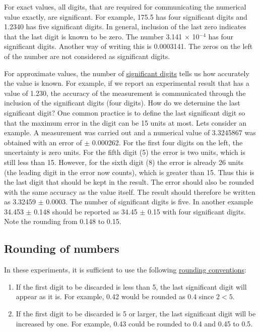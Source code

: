 \documentclass[byrevtex,amssymb,aps,pra,floatfix,letterpaper]{revtex4}
\begin{document}
For exact values, all digits, that are required for communicating the numerical value exactly, are significant. For example, 175.5 has four significant digits and 1.2340 has five significant digits. In general, inclusion of the last zero indicates that the last digit is known to be zero. The number 3.141 $\times$ 10$^{-4}$ has four significant digits. Another way of writing this is 0.0003141. The zeros on the left of the number are not considered as significant digits.

For approximate values, the number of \href{http://en.wikipedia.org/wiki/Significant_figures}{\underline{significant digits}} tells us how accurately the value is known. For example, if we report an experimental result that has a value of 1.230, the accuracy of the measurement is communicated through the inclusion of the significant digits (four digits). How do we determine the last significant digit? One common practice is to define the last significant digit so that the maximum error in the digit can be 15 units at most. Lets consider an example. A measurement was carried out and a numerical value of 3.3245867 was obtained with an error of $\pm$ 0.000262. For the first four digits on the left, the uncertainty is zero units. For the fifth digit (5) the error is two units, which is still less than 15. However, for the sixth digit (8) the error is already 26 units (the leading digit in the error now counts), which is greater than 15. Thus this is the last digit that should be kept in the result. The error should also be rounded with the same accuracy as the value itself. The result should therefore be written as 3.32459 $\pm$ 0.0003. The number of significant digits is five. In another example 34.453 $\pm$ 0.148 should be reported as 34.45 $\pm$ 0.15 with four significant digits. Note the rounding from 0.148 to 0.15.

\subsection{Rounding of numbers}

In these experiments, it is sufficient to use the following \href{http://en.wikipedia.org/wiki/Rounding}{\underline{rounding conventions}}:

\begin{enumerate}
\item If the first digit to be discarded is less than 5, the last significant digit will appear as it is. For example, 0.42 would be rounded as 0.4 since $2<5$.
\item If the first digit to be discarded is 5 or larger, the last significant digit will be increased by one.
For example, 0.43 could be rounded to 0.4 and 0.45 to 0.5.
\end{enumerate}
\end{document}
